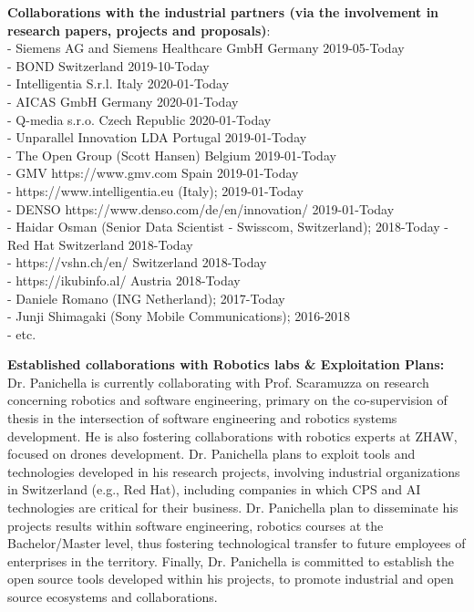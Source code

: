 \documentclass[12pt]{article}
\begin{document}
\textbf{Collaborations with the industrial partners (via the involvement in research papers, projects and proposals)}:\\
- Siemens AG and Siemens Healthcare GmbH	Germany	2019-05-Today\\
- BOND	Switzerland	2019-10-Today\\
- Intelligentia S.r.l.	Italy	2020-01-Today\\
- AICAS GmbH	Germany	2020-01-Today\\
- Q-media s.r.o.	Czech Republic	2020-01-Today\\
- Unparallel Innovation LDA	Portugal	2019-01-Today\\
- The Open Group (Scott Hansen) Belgium 2019-01-Today\\
- GMV https://www.gmv.com Spain 2019-01-Today\\
- https://www.intelligentia.eu (Italy); 2019-01-Today\\
- DENSO https://www.denso.com/de/en/innovation/ 2019-01-Today\\
- Haidar Osman (Senior Data Scientist - Swisscom, Switzerland); 2018-Today
- Red Hat Switzerland 2018-Today\\
- https://vshn.ch/en/ Switzerland 2018-Today\\
- https://ikubinfo.al/ Austria 2018-Today\\
- Daniele Romano (ING Netherland); 2017-Today\\
- Junji Shimagaki (Sony Mobile Communications); 2016-2018\\
- etc.

\textbf{Established collaborations with Robotics labs \& Exploitation Plans:}\\
 Dr. Panichella is currently collaborating with Prof. Scaramuzza on research concerning robotics and software engineering, primary on the co-supervision of thesis in the intersection of software engineering and robotics systems development. He is also fostering collaborations with robotics experts at ZHAW, focused on drones development.
 Dr. Panichella plans to exploit tools and technologies developed in his research projects, involving industrial organizations in Switzerland (e.g., Red Hat), including companies
in which CPS and AI technologies are critical for their business. 
Dr. Panichella plan to disseminate his projects results within software engineering, robotics courses at the Bachelor/Master level, thus fostering
technological transfer to future employees of enterprises in the territory. Finally, Dr. Panichella is committed to establish the open source tools developed within his projects, to promote industrial and open source ecosystems and collaborations.\\
\end{document}
